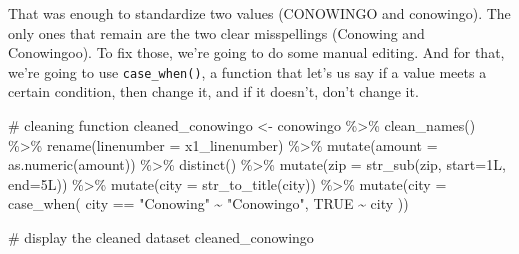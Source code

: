 \documentclass[
  letterpaper,
  DIV=11,
  numbers=noendperiod]{scrreprt}
\newenvironment{Shaded}{\begin{snugshade}}{\end{snugshade}}
\newcommand{\AttributeTok}[1]{\textcolor[rgb]{0.40,0.45,0.13}{#1}}
\newcommand{\CommentTok}[1]{\textcolor[rgb]{0.37,0.37,0.37}{#1}}
\newcommand{\ConstantTok}[1]{\textcolor[rgb]{0.56,0.35,0.01}{#1}}
\newcommand{\FunctionTok}[1]{\textcolor[rgb]{0.28,0.35,0.67}{#1}}
\newcommand{\NormalTok}[1]{\textcolor[rgb]{0.00,0.23,0.31}{#1}}
\newcommand{\OtherTok}[1]{\textcolor[rgb]{0.00,0.23,0.31}{#1}}
\newcommand{\SpecialCharTok}[1]{\textcolor[rgb]{0.37,0.37,0.37}{#1}}
\newcommand{\StringTok}[1]{\textcolor[rgb]{0.13,0.47,0.30}{#1}}
\begin{document}
That was enough to standardize two values (CONOWINGO and conowingo). The
only ones that remain are the two clear misspellings (Conowing and
Conowingoo). To fix those, we're going to do some manual editing. And
for that, we're going to use \texttt{case\_when()}, a function that
let's us say if a value meets a certain condition, then change it, and
if it doesn't, don't change it.

\begin{Shaded}
\begin{Highlighting}[]
\CommentTok{\# cleaning function}
\NormalTok{cleaned\_conowingo }\OtherTok{\textless{}{-}}\NormalTok{ conowingo }\SpecialCharTok{\%\textgreater{}\%}
  \FunctionTok{clean\_names}\NormalTok{() }\SpecialCharTok{\%\textgreater{}\%} 
  \FunctionTok{rename}\NormalTok{(}\AttributeTok{linenumber =}\NormalTok{ x1\_linenumber) }\SpecialCharTok{\%\textgreater{}\%} 
  \FunctionTok{mutate}\NormalTok{(}\AttributeTok{amount =} \FunctionTok{as.numeric}\NormalTok{(amount)) }\SpecialCharTok{\%\textgreater{}\%} 
  \FunctionTok{distinct}\NormalTok{() }\SpecialCharTok{\%\textgreater{}\%}
  \FunctionTok{mutate}\NormalTok{(}\AttributeTok{zip =} \FunctionTok{str\_sub}\NormalTok{(zip, }\AttributeTok{start=}\NormalTok{1L, }\AttributeTok{end=}\NormalTok{5L)) }\SpecialCharTok{\%\textgreater{}\%}
  \FunctionTok{mutate}\NormalTok{(}\AttributeTok{city =} \FunctionTok{str\_to\_title}\NormalTok{(city)) }\SpecialCharTok{\%\textgreater{}\%}
  \FunctionTok{mutate}\NormalTok{(}\AttributeTok{city =} \FunctionTok{case\_when}\NormalTok{(}
\NormalTok{    city }\SpecialCharTok{==} \StringTok{"Conowing"} \SpecialCharTok{\textasciitilde{}} \StringTok{"Conowingo"}\NormalTok{,}
    \ConstantTok{TRUE} \SpecialCharTok{\textasciitilde{}}\NormalTok{ city}
\NormalTok{  ))}

\CommentTok{\# display the cleaned dataset}
\NormalTok{cleaned\_conowingo}
\end{Highlighting}
\end{Shaded}
\end{document}
